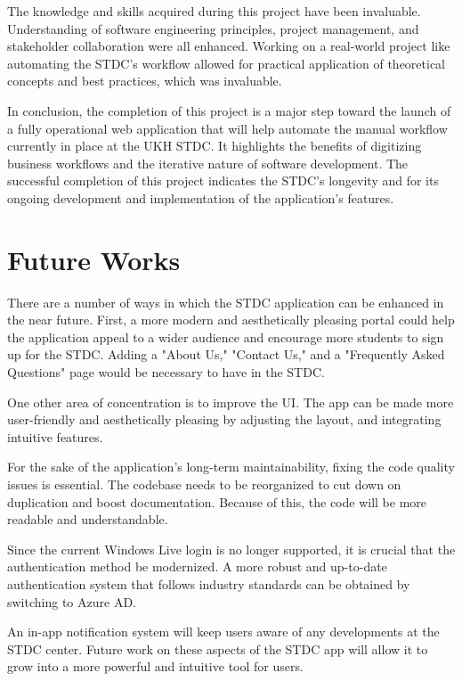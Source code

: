 \begin{justify}
    \vspace{0.25cm}
    \newendline The knowledge and skills acquired during this project have been invaluable. Understanding of software engineering principles, project management, and stakeholder collaboration were all enhanced. Working on a real-world project like automating the STDC's workflow allowed for practical application of theoretical concepts and best practices, which was invaluable.
    
    \vspace{0.25cm}
    \newendline In conclusion, the completion of this project is a major step toward the launch of a fully operational web application that will help automate the manual workflow currently in place at the UKH STDC. It highlights the benefits of digitizing business workflows and the iterative nature of software development. The successful completion of this project indicates the STDC's longevity and for its ongoing development and implementation of the application's features.\\
\end{justify}



\section{Future Works}

\begin{justify}
    There are a number of ways in which the STDC application can be enhanced in the near future. First, a more modern and aesthetically pleasing portal could help the application appeal to a wider audience and encourage more students to sign up for the STDC. Adding a "About Us," "Contact Us," and a "Frequently Asked Questions" page would be necessary to have in the STDC.

    \vspace{0.25cm}
    \newendline One other area of concentration is to improve the UI. The app can be made more user-friendly and aesthetically pleasing by adjusting the layout, and integrating intuitive features.

    \vspace{0.25cm}
    \newendline For the sake of the application's long-term maintainability, fixing the code quality issues is essential. The codebase needs to be reorganized to cut down on duplication and boost documentation. Because of this, the code will be more readable and understandable.

    \vspace{0.25cm}
    \newendline Since the current Windows Live login is no longer supported, it is crucial that the authentication method be modernized. A more robust and up-to-date authentication system that follows industry standards can be obtained by switching to Azure AD.

    \vspace{0.25cm}
    \newendline An in-app notification system will keep users aware of any developments at the STDC center. Future work on these aspects of the STDC app will allow it to grow into a more powerful and intuitive tool for users.
\end{justify}

\clearpage

